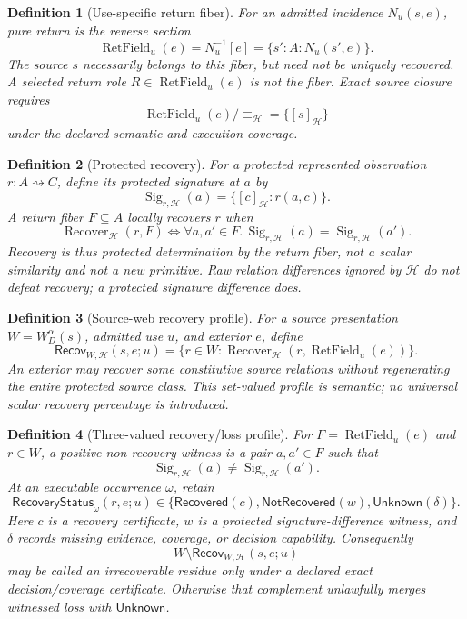 \documentclass[11pt,oneside]{article}
\newtheorem{definition}{Definition}[section]
\newcommand{\RetField}{\operatorname{RetField}}
\newcommand{\Sig}{\operatorname{Sig}}
\newcommand{\Recover}{\operatorname{Recover}}
\begin{document}
\begin{definition}[Use-specific return fiber]\label{def:return-fiber}
For an admitted incidence \(N_u(s,e)\), pure return is the reverse section
\[
\boxed{
\RetField_u(e)
=
N_u^{-1}[e]
=
\{s':A:N_u(s',e)\}.
}
\]
The source \(s\) necessarily belongs to this fiber, but need not be uniquely recovered.  A selected return role \(R\in\RetField_u(e)\) is not the fiber.  Exact source closure requires
\[
\RetField_u(e)/{\equiv_{\mathcal H}}=\{[s]_{\mathcal H}\}
\]
under the declared semantic and execution coverage.
\end{definition}

\begin{definition}[Protected recovery]\label{def:protected-recovery}
For a protected represented observation \(r:A\rightsquigarrow C\), define its protected signature at \(a\) by
\[
\Sig_{r,\mathcal H}(a)
=
\{[c]_{\mathcal H}:r(a,c)\}.
\]
A return fiber \(F\subseteq A\) locally recovers \(r\) when
\[
\boxed{
\Recover_{\mathcal H}(r,F)
\iff
\forall a,a'\in F.\,
\Sig_{r,\mathcal H}(a)=\Sig_{r,\mathcal H}(a').
}
\]
Recovery is thus protected determination by the return fiber, not a scalar similarity and not a new primitive.  Raw relation differences ignored by \(\mathcal H\) do not defeat recovery; a protected signature difference does.
\end{definition}

\begin{definition}[Source-web recovery profile]\label{def:web-recovery}
For a source presentation \(W=W_D^\alpha(s)\), admitted use \(u\), and exterior \(e\), define
\[
\boxed{
\mathsf{Recov}_{W,\mathcal H}(s,e;u)
=
\{r\in W:\Recover_{\mathcal H}(r,\RetField_u(e))\}.
}
\]
An exterior may recover some constitutive source relations without regenerating the entire protected source class.  This set-valued profile is semantic; no universal scalar recovery percentage is introduced.
\end{definition}

\begin{definition}[Three-valued recovery/loss profile]\label{def:recovery-loss-profile}
For \(F=\RetField_u(e)\) and \(r\in W\), a positive non-recovery witness is a pair
\(a,a'\in F\) such that
\[
\Sig_{r,\mathcal H}(a)\neq\Sig_{r,\mathcal H}(a').
\]
At an executable occurrence \(\omega\), retain
\[
\boxed{
\mathsf{RecoveryStatus}_{\omega}(r,e;u)
\in
\{
\mathsf{Recovered}(c),
\mathsf{NotRecovered}(w),
\mathsf{Unknown}(\delta)
\}.
}
\]
Here \(c\) is a recovery certificate, \(w\) is a protected signature-difference
witness, and \(\delta\) records missing evidence, coverage, or decision capability.
Consequently
\[
W\setminus\mathsf{Recov}_{W,\mathcal H}(s,e;u)
\]
may be called an irrecoverable residue only under a declared exact decision/coverage
certificate.  Otherwise that complement unlawfully merges witnessed loss with
\(\mathsf{Unknown}\).
\end{definition}
\end{document}
